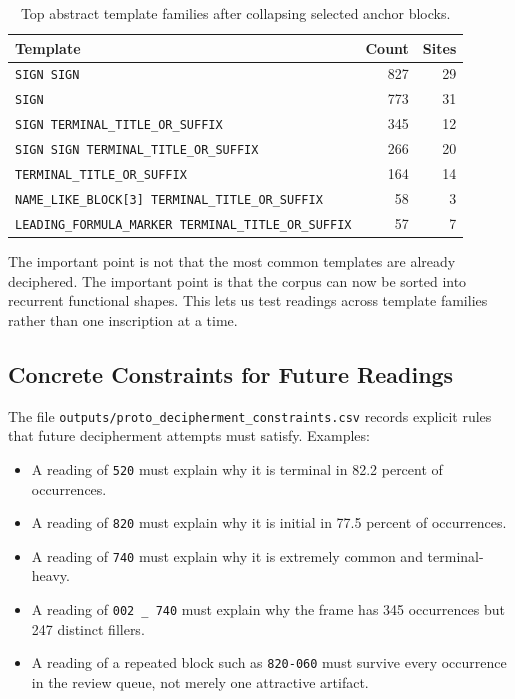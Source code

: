 \begin{table}[htbp]
\centering
\begin{tabular}{p{}rr}
\toprule
\textbf{Template} & \textbf{Count} & \textbf{Sites} \\
\midrule
\texttt{SIGN SIGN} & 827 & 29 \\
\texttt{SIGN} & 773 & 31 \\
\texttt{SIGN TERMINAL\_TITLE\_OR\_SUFFIX} & 345 & 12 \\
\texttt{SIGN SIGN TERMINAL\_TITLE\_OR\_SUFFIX} & 266 & 20 \\
\texttt{TERMINAL\_TITLE\_OR\_SUFFIX} & 164 & 14 \\
\texttt{NAME\_LIKE\_BLOCK[3] TERMINAL\_TITLE\_OR\_SUFFIX} & 58 & 3 \\
\texttt{LEADING\_FORMULA\_MARKER TERMINAL\_TITLE\_OR\_SUFFIX} & 57 & 7 \\
\bottomrule
\end{tabular}
\caption{Top abstract template families after collapsing selected anchor blocks.}
\label{tab:abstract-template-families}
\end{table}

The important point is not that the most common templates are already deciphered. The important point is that the corpus can now be sorted into recurrent functional shapes. This lets us test readings across template families rather than one inscription at a time.

\subsection{Concrete Constraints for Future Readings}

The file \texttt{outputs/proto\_decipherment\_constraints.csv} records explicit rules that future decipherment attempts must satisfy. Examples:

\begin{itemize}
  \item A reading of \texttt{520} must explain why it is terminal in 82.2 percent of occurrences.
  \item A reading of \texttt{820} must explain why it is initial in 77.5 percent of occurrences.
  \item A reading of \texttt{740} must explain why it is extremely common and terminal-heavy.
  \item A reading of \texttt{002 \_ 740} must explain why the frame has 345 occurrences but 247 distinct fillers.
  \item A reading of a repeated block such as \texttt{820-060} must survive every occurrence in the review queue, not merely one attractive artifact.
\end{itemize}


